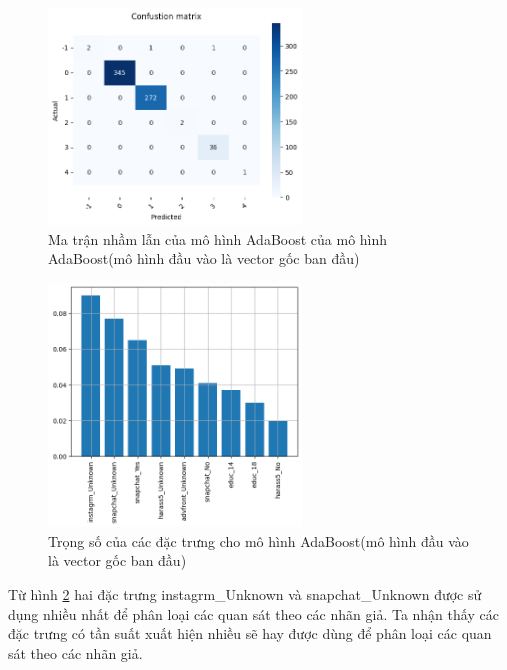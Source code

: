 \begin{enumerate}[label=(\alph*)]
    \begin{figure}[H]
        \centering
        \includegraphics[width=0.6\textwidth]{figures/Thanh/Data_Analysis/Non_null_confusion_matrix_AdaBoost_original_features.png}
        \caption{Ma trận nhầm lẫn của mô hình AdaBoost của mô hình AdaBoost(mô hình đầu vào là vector gốc ban đầu)}
        \label{fig:Non_null_confusion_matrix_AdaBoost_original_features}
    \end{figure}

    \begin{figure}[H]
        \centering
        \includegraphics[width=0.6\textwidth]{figures/Thanh/Data_Analysis/Non_null_Feature_Importance_AdaBoost_original_features.png}
        \caption{Trọng số của các đặc trưng cho mô hình AdaBoost(mô hình đầu vào là vector gốc ban đầu)}
        \label{fig:Non_null_Feature_Importance_AdaBoost_original_features}
    \end{figure}

    Từ hình \ref{fig:Non_null_Feature_Importance_AdaBoost_original_features} hai đặc trưng instagrm\_Unknown và snapchat\_Unknown được sử dụng nhiều
    nhất để phân loại các quan sát theo các nhãn giả. Ta nhận thấy các đặc trưng có tần suất xuất hiện nhiều sẽ hay được dùng để phân loại các quan sát theo các nhãn giả.
\end{enumerate}

